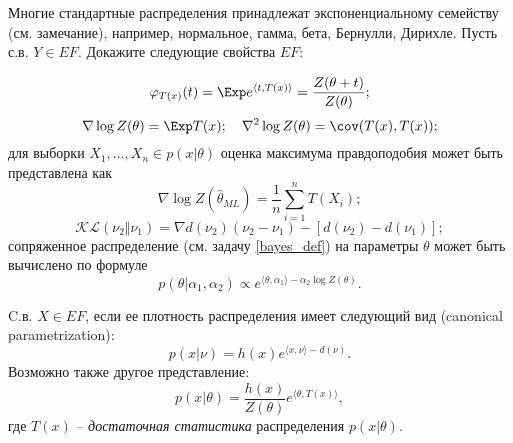 \begin{problem}
\label{EF}
Многие стандартные распределения принадлежат экспоненциальному семейству (см. замечание), например, нормальное, гамма, бета, Бернулли, Дирихле. 
Пусть с.в. $Y \in EF$. Докажите следующие свойства $EF$:

\[
\varphi_{T(x)}(t) = \Exp e^{\langle t, T(x) \rangle} = \frac{Z(\theta + t)}{Z(\theta)};
\]
\[
\nabla \log Z(\theta) = \Exp T(x);
\quad
\nabla^2 \log Z(\theta) = \cov (T(x), T(x));
\]
для выборки $X_1,\ldots,X_n \in p(x|\theta)$ оценка максимума правдоподобия может быть представлена как 
\[
\nabla \log Z(\widehat{\theta}_{ML}) = \frac{1}{n} \sum_{i=1}^{n} T(X_i);
\]
\[
\mathcal{KL}(\nu_2 \Vert \nu_1) = \nabla d(\nu_2) (\nu_2 - \nu_1) - [d(\nu_2) - d(\nu_1)];
\]
сопряженное распределение (см. задачу \ref{bayes_def}) на параметры $\theta$ может быть вычислено по формуле
\[
p(\theta | \alpha_1, \alpha_2) \propto e^{ \langle \theta, \alpha_1 \rangle - \alpha_2 \log Z(\theta)}.
\]

\end{problem}

\begin{remark}
C.в. $X \in EF$, если ее плотность распределения имеет следующий вид (canonical   parametrization):
\[
p(x | \nu) = h(x)e^{\langle x, \nu \rangle - d(\nu)}. 
\]
Возможно также другое представление:
\[
p(x | \theta) = \frac{h(x)}{Z(\theta)} e^{ \langle \theta, T(x) \rangle}, 
\]
где $T(x)$ -- \textit{достаточная статистика} распределения $p(x | \theta)$.
\end{remark}


